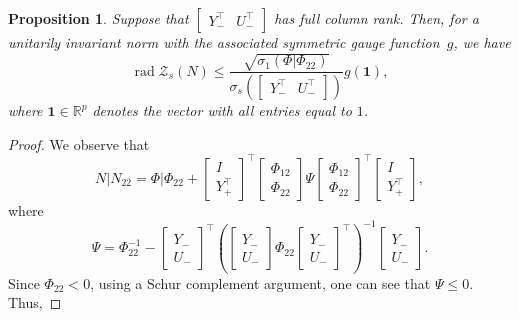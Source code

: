 \documentclass[pdflatex,sn-mathphys-num]{sn-jnl}%
\DeclareMathOperator{\rad}{rad}
\theoremstyle{thmstyleone}
\newtheorem{proposition}[theorem]{Proposition}
\begin{document}
\begin{proposition}
\label{prop:SNR_1}
Suppose that $\begin{bmatrix}
Y_-^\top & U_-^\top
\end{bmatrix}$ has full column rank. Then, for a unitarily invariant norm with the associated symmetric gauge \mbox{function $g$}, we have 
\begin{equation}
\label{eq:prop_rad_upper}
\rad\mathcal{Z}_s(N)\leq \frac{\sqrt{\sigma_1(\Phi|\Phi_{22})}}{\sigma_{s}\left(\begin{bmatrix}
Y_-^\top & U_-^\top
\end{bmatrix}\right)}g(\mathbf{1}),
\end{equation}
where $\mathbf{1}\in\mathbb{R}^p$ denotes the vector with all entries equal to $1$. 
\end{proposition}
\begin{proof}
We observe that
\begin{equation}
N|N_{22}=\Phi|\Phi_{22}+\begin{bmatrix}
I \\ Y_+^\top
\end{bmatrix}^\top \begin{bmatrix}
\Phi_{12} \\ \Phi_{22}
\end{bmatrix}\Psi\begin{bmatrix}
\Phi_{12} \\ \Phi_{22}
\end{bmatrix}^\top\begin{bmatrix}
I \\ Y_+^\top
\end{bmatrix},
\end{equation}
where
\begin{equation}
\Psi=\Phi_{22}^{-1}-\begin{bmatrix}
Y_- \\ U_-
\end{bmatrix}^\top\left(\begin{bmatrix}
Y_- \\ U_-
\end{bmatrix}\Phi_{22}\begin{bmatrix}
Y_- \\ U_-
\end{bmatrix}^\top\right)^{-1}\begin{bmatrix}
Y_- \\ U_-
\end{bmatrix}.
\end{equation}
Since $\Phi_{22}<0$, using a Schur complement argument, one can see that $\Psi\leq 0$. Thus,

\end{proof}
\end{document}
